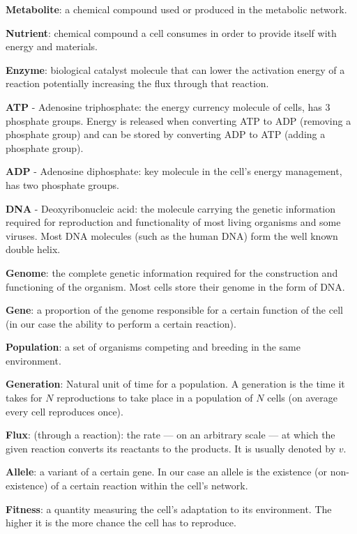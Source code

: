 \documentclass[a4paper,12pt]{article}
\begin{document}
	\begin{framed}

		\textbf{Metabolite}: a chemical compound used or produced in the metabolic network. 

		\textbf{Nutrient}: chemical compound a cell consumes in order to provide itself with energy and materials.

		\textbf{Enzyme}: biological catalyst molecule that can lower the activation energy of a reaction potentially increasing the flux through that reaction. 

	\textbf{ATP} - Adenosine triphosphate: the energy currency molecule of cells, has 3 phosphate groups. Energy is released when converting ATP to ADP (removing a phosphate group) and can be stored by converting ADP to ATP (adding a phosphate group).

	\textbf{ADP} - Adenosine diphosphate: key molecule in the cell's energy management, has two phosphate groups.

	\textbf{DNA} - Deoxyribonucleic acid: the molecule carrying the genetic information required for reproduction and functionality of most living organisms and some viruses. Most DNA molecules (such as the human DNA) form the well known double helix. 

	\textbf{Genome}: the complete genetic information required for the construction and functioning of the organism. Most cells store their genome in the form of DNA. 

	\textbf{Gene}: a proportion of the genome responsible for a certain function of the cell (in our case the ability to perform a certain reaction). 

	\textbf{Population}: a set of organisms competing and breeding in the same environment.

	\textbf{Generation}: Natural unit of time for a population. A generation is the time it takes for $N$ reproductions to take place in a population of $N$ cells (on average every cell reproduces once).

	\textbf{Flux}: (through a reaction): the rate ---  on an arbitrary scale --- at which the given reaction converts its reactants to the products. It is usually denoted by $v$. 

	\textbf{Allele}: a variant of a certain gene. In our case an allele is the existence (or non-existence) of a certain reaction within the cell's network.

	\textbf{Fitness}: a quantity measuring the cell's adaptation to its environment. The higher it is the more chance the cell has to reproduce.


\end{framed}
\end{document}

